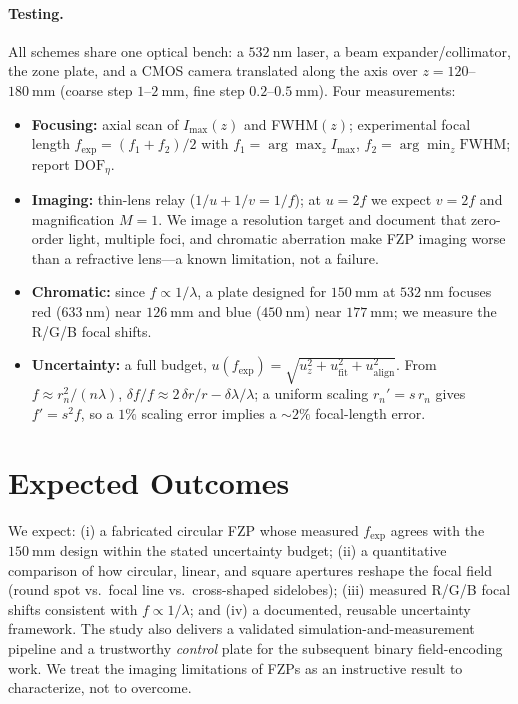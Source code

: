 \documentclass[11pt,a4paper]{article}
\begin{document}
\paragraph{Testing.} All schemes share one optical bench: a $532~\mathrm{nm}$ laser, a beam expander/collimator, the zone plate, and a CMOS camera translated along the axis over $z=120$--$180~\mathrm{mm}$ (coarse step $1$--$2~\mathrm{mm}$, fine step $0.2$--$0.5~\mathrm{mm}$). Four measurements:
\begin{itemize}[leftmargin=1.4em,itemsep=2pt,topsep=2pt]
  \item \textbf{Focusing:} axial scan of $I_{\max}(z)$ and FWHM$(z)$; experimental focal length $f_{\exp}=(f_1+f_2)/2$ with $f_1=\arg\max_z I_{\max}$, $f_2=\arg\min_z \mathrm{FWHM}$; report $\mathrm{DOF}_\eta$.
  \item \textbf{Imaging:} thin-lens relay ($1/u+1/v=1/f$); at $u=2f$ we expect $v=2f$ and magnification $M=1$. We image a resolution target and document that zero-order light, multiple foci, and chromatic aberration make FZP imaging worse than a refractive lens---a known limitation, not a failure.
  \item \textbf{Chromatic:} since $f\propto 1/\lambda$, a plate designed for $150~\mathrm{mm}$ at $532~\mathrm{nm}$ focuses red ($633~\mathrm{nm}$) near $126~\mathrm{mm}$ and blue ($450~\mathrm{nm}$) near $177~\mathrm{mm}$; we measure the R/G/B focal shifts.
  \item \textbf{Uncertainty:} a full budget, $u(f_{\exp})=\sqrt{u_z^2+u_{\mathrm{fit}}^2+u_{\mathrm{align}}^2}$. From $f\approx r_n^2/(n\lambda)$, $\delta f/f \approx 2\,\delta r/r - \delta\lambda/\lambda$; a uniform scaling $r_n'=s\,r_n$ gives $f'=s^2 f$, so a $1\%$ scaling error implies a $\sim$$2\%$ focal-length error.
\end{itemize}

\section{Expected Outcomes}

We expect: (i) a fabricated circular FZP whose measured $f_{\exp}$ agrees with the $150~\mathrm{mm}$ design within the stated uncertainty budget; (ii) a quantitative comparison of how circular, linear, and square apertures reshape the focal field (round spot vs.\ focal line vs.\ cross-shaped sidelobes); (iii) measured R/G/B focal shifts consistent with $f\propto 1/\lambda$; and (iv) a documented, reusable uncertainty framework. The study also delivers a validated simulation-and-measurement pipeline and a trustworthy \emph{control} plate for the subsequent binary field-encoding work. We treat the imaging limitations of FZPs as an instructive result to characterize, not to overcome.
\end{document}
